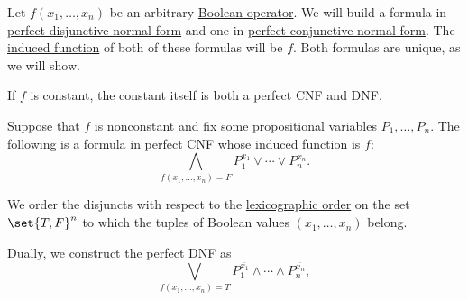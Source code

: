 \begin{algorithm}\label{alg:perfect_cnf_and_dnf}
  Let \( f(x_1, \ldots, x_n) \) be an arbitrary \hyperref[def:boolean_operator]{Boolean operator}. We will build a formula in \hyperref[def:cnf_and_dnf/perfect]{perfect disjunctive normal form} and one in \hyperref[def:cnf_and_dnf/perfect]{perfect conjunctive normal form}. The \hyperref[def:propositional_valuation/valuation_function]{induced function} of both of these formulas will be \( f \). Both formulas are unique, as we will show.

  \begin{thmenum}
     If \( f \) is constant, the constant itself is both a perfect CNF and DNF.

     Suppose that \( f \) is nonconstant and fix some propositional variables \( P_1, \ldots, P_n \). The following is a formula in perfect CNF whose \hyperref[def:propositional_valuation/valuation_function]{induced function} is \( f \):
    \begin{equation}\label{alg:perfect_cnf_and_dnf/cnf}
      \bigwedge_{f(x_1, \ldots, x_n) = F} P_1^{x_1} \vee \cdots \vee P_n^{x_n}.
    \end{equation}

    We order the disjuncts with respect to the \hyperref[def:lexicographic_order]{lexicographic order} on the set \( \set{ T, F }^n \) to which the tuples of Boolean values \( (x_1, \ldots, x_n) \) belong.

    \hyperref[thm:lattice_duality]{Dually}, we construct the perfect DNF as
    \begin{equation}\label{alg:perfect_cnf_and_dnf/dnf}
      \bigvee_{f(x_1, \ldots, x_n) = T} P_1^{\overline{x_1}} \wedge \cdots \wedge P_n^{\overline{x_n}},
    \end{equation}
  \end{thmenum}
\end{algorithm}
